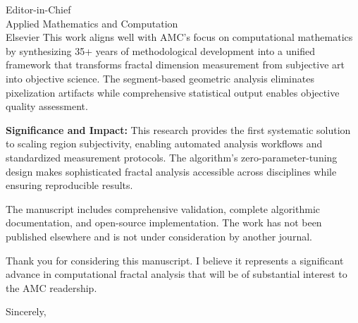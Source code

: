 \documentclass[11pt]{letter}
\begin{document}
\begin{letter}{Editor-in-Chief\\
Applied Mathematics and Computation\\
Elsevier}
This work aligns well with AMC's focus on computational mathematics by synthesizing 35+ years of methodological development into a unified framework that transforms fractal dimension measurement from subjective art into objective science. The segment-based geometric analysis eliminates pixelization artifacts while comprehensive statistical output enables objective quality assessment.

\textbf{Significance and Impact:} This research provides the first systematic solution to scaling region subjectivity, enabling automated analysis workflows and standardized measurement protocols. The algorithm's zero-parameter-tuning design makes sophisticated fractal analysis accessible across disciplines while ensuring reproducible results.

The manuscript includes comprehensive validation, complete algorithmic documentation, and open-source implementation. The work has not been published elsewhere and is not under consideration by another journal.

Thank you for considering this manuscript. I believe it represents a significant advance in computational fractal analysis that will be of substantial interest to the AMC readership.

\closing{Sincerely,}

\end{letter}
\end{document}
